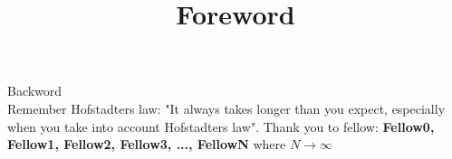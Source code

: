 \title{Foreword}

Backword
\\

Remember Hofstadters law: "It always takes longer than you expect, especially when you take into account Hofstadters law".
Thank you to fellow:  \textbf{Fellow0, Fellow1, Fellow2, Fellow3, ..., FellowN} where $N \rightarrow \infty$